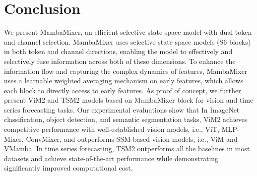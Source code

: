 \documentclass{article}
\begin{document}
\begin{table}[ht]
    \centering
        \caption{Ablation study on the architecture of TSM2 on ETTh1, ETTm1, Exchange, and Electricity datasets.}
    \label{tab:ablation-study}
\end{table}



\section{Conclusion}
We present MambaMixer, an efficient selective state space model with dual token and channel selection. MambaMixer uses selective state space models (S6 blocks) in both token and channel directions, enabling the model to effectively and selectively fuse information across both of these dimensions. To enhance the information flow and capturing the complex dynamics of features, MambaMixer uses a learnable weighted averaging mechanism on early features, which allows each block to directly access to early features. As proof of concept, we further present ViM2 and TSM2 models based on MambaMixer block for vision and time series forecasting tasks. Our experimental evaluations show that In ImageNet classification, object detection, and semantic segmentation tasks, ViM2 achieves competitive performance with well-established vision models, i.e., ViT, MLP-Mixer, ConvMixer, and outperforms SSM-based vision models, i.e., ViM and VMamba. In time series forecasting, TSM2 outperforms all the baselines in most datasets and achieve state-of-the-art performance while demonstrating significantly improved computational cost. 



\end{document}
